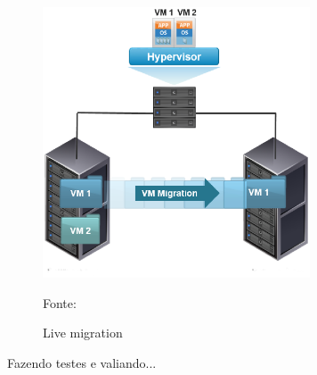 
\begin{figure}[h!]
 \centering
 \includegraphics[width=300px]{img/vms_migration.eps}
 \caption{Live migration}
 Fonte: \citet{spaniol2015}
 \label{fig:vms_migration}
\end{figure}

Fazendo testes e valiando...



